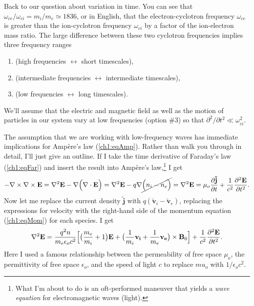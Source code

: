 Back to our question about variation in time. You can see that
$\omega_{ce} / \omega_{ci} = m_i/m_e \simeq 1836$, or in English, that the
electron-cyclotron frequency $\omega_{ce}$ is greater than the ion-cyclotron
frequency $\omega_{ci}$ by a factor of the ion-electron mass ratio. The large
difference between these two cyclotron frequencies implies three frequency
ranges \par
\begin{enumerate}
\item {} (high frequencies $\leftrightarrow$ short timescales),
\item {} (intermediate frequencies $\leftrightarrow$ intermediate timescales),
\item {} (low frequencies $\leftrightarrow$ long timescales).
\end{enumerate}
We'll assume that the electric and magnetic field as well as the motion of
particles in our system vary at low frequencies (option \#3) so that
$\partial^2 / \partial t^2 \ll \omega_{ci}^2$. 

The assumption that we are working with low-frequency waves has immediate
implications for Amp\`{e}re's law (\ref{ch1:eqAmp}). Rather than walk you
through in detail, I'll just give an outline. If I take the time derivative of
Faraday's law (\ref{ch1:eqFar}) and insert the result into Amp\`{e}re's
law,\footnote{What I'm about to do is an oft-performed maneuver that yields a
  \emph{wave equation} for electromagnetic waves (light).} I get
\begin{equation} - {\bf \nabla} \times {\bf \nabla} \times \mathbf{E} = {\bf \nabla}^2 \mathbf{E} -
  {\bf \nabla} \Big ( {\bf \nabla} \cdot \mathbf{E} \Big ) = {\bf \nabla}^2 \mathbf{E} - q {\bf \nabla}
  \cancel{\Big ( n_i - n_e \Big )} = {\bf \nabla}^2 \mathbf{E} = \mu_o \dfrac{\partial
    \mathbf{\tilde j}}{\partial t} + \dfrac{1}{c^2} \dfrac{\partial^2
    \mathbf{E}}{\partial t^2}.
\end{equation} 
Now let me replace the current density $\mathbf{\tilde j}$ with
$q ( \mathbf{\tilde v}_i - \mathbf{\tilde v}_e )$, replacing the expressions for
velocity with the right-hand side of the momentum equation (\ref{ch1:eqMom}) for
each species. I get
\begin{equation} {\bf \nabla}^2 \mathbf{E} = \dfrac{q^2 n }{m_e \epsilon_o c^2} \Big [ \big (
  \dfrac{m_e}{m_i} + 1 \big ) \mathbf{E} + \big ( \dfrac{1}{m_i} \mathbf{v_i} +
  \dfrac{1}{m_e} \mathbf{v_e} \big ) \times \mathbf{B}_0 \Big ] + \dfrac{1}{c^2}
  \dfrac{\partial^2 \mathbf{E}}{\partial t^2}.
\end{equation} 
Here I used a famous relationship between the permeability of free space
$\mu_o$, the permittivity of free space $\epsilon_o$, and the speed of light $c$
to replace $mu_o$ with $1 / \epsilon_o c^2$. 

